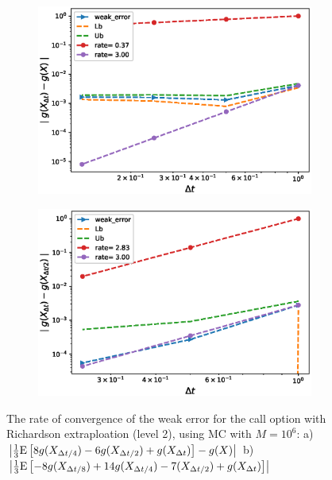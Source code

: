 \documentclass[11pt]{article}
\newcommand{\expt}[1]{\mathrm{E}\left[#1\right]}
\begin{document}
\begin{figure}[h!]
	\centering
	\begin{subfigure}{.4\textwidth}
		\centering
		\includegraphics[width=1\linewidth]{./figures/weak_error_rates_call/Beta_10/with_richardson/weak_convergence_order_Call_richardson_level2_relative_M_10_6}
		\caption{}
		\label{fig:sub3}
	\end{subfigure}%
	\begin{subfigure}{.4\textwidth}
		\centering
		\includegraphics[width=1\linewidth]{./figures/weak_error_rates_call/Beta_10/with_richardson/weak_convergence_order_differences_Call_richardson_level2_relative_M_10_6}
		\caption{}
		\label{fig:sub4}
	\end{subfigure}
	
	\caption{The rate of convergence of the weak error for the  call option with Richardson extraploation (level 2), using MC with $M=10^6$: a) $\abs{\frac{1}{3}\expt{8 g(X_{\Delta t/4}) -6g(X_{\Delta t/2}) +g(X_{\Delta t})}-g(X)}$  b) $\abs{\frac{1}{3}\expt{-8 g(X_{\Delta t/8}) +14g(X_{\Delta t/4})-7 (X_{\Delta t/2}) +g(X_{\Delta t})}}$}
	\label{fig:Weak_rate_call_with_rich_level2}
\end{figure}
\end{document}
